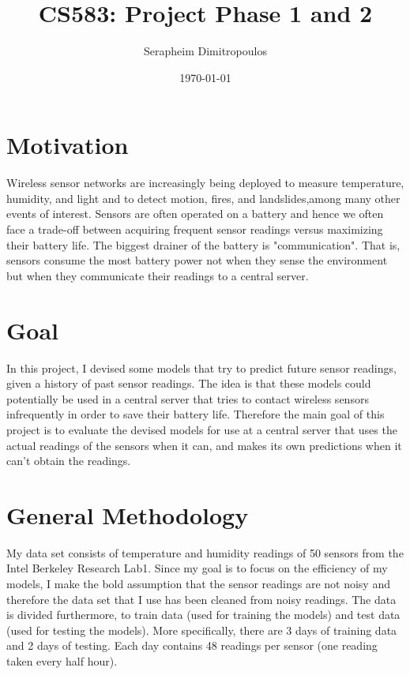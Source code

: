 \documentclass{article}
\title{CS583: Project Phase 1 and 2}
\date{\today}
\author{Serapheim Dimitropoulos}
\begin{document}
\maketitle

\section{Motivation}

Wireless sensor networks are increasingly being deployed
to measure temperature, humidity, and light and to detect
motion, fires, and landslides,among many other events of
interest. Sensors are often operated on a battery and hence
we often face a trade-off between acquiring frequent sensor
readings versus maximizing their battery life. The biggest
drainer of the battery is "communication". That is, sensors
consume the most battery power not when they sense the
environment but when they communicate their readings to a
central server.

\section{Goal}

In this project, I devised some models that try to predict
future sensor readings, given a history of past sensor
readings. The idea is that these models could potentially
be used in a central server that tries to contact
wireless sensors infrequently in order to save their
battery life. Therefore the main goal of this project
is to evaluate the devised models for use at a central
server that uses the actual readings of the sensors when
it can, and makes its own predictions when it can't
obtain the readings.

\section{General Methodology}

My data set consists of temperature and humidity readings
of 50 sensors from the Intel Berkeley Research Lab1. Since
my goal is to focus on the efficiency of my models, I make
the bold assumption that the sensor readings are not noisy
and therefore the data set that I use has been cleaned from
noisy readings. The data is divided furthermore, to train
data (used for training the models) and test data (used for
testing the models). More specifically, there are 3 days
of training data and 2 days of testing. Each day contains
48 readings per sensor (one reading taken every half hour).
\end{document}
